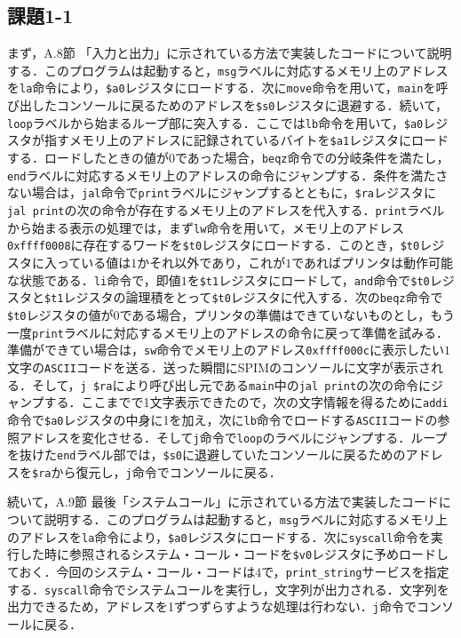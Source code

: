 \subsection{課題1-1}
まず，A.8節 「入力と出力」に示されている方法で実装したコードについて説明する\cite{book:assembly}．このプログラムは起動すると，\verb|msg|ラベルに対応するメモリ上のアドレスを\verb|la|命令により，\verb|$a0|レジスタにロードする．次に\verb|move|命令を用いて，\verb|main|を呼び出したコンソールに戻るためのアドレスを\verb|$s0|レジスタに退避する．続いて，\verb|loop|ラベルから始まるループ部に突入する．ここでは\verb|lb|命令を用いて，\verb|$a0|レジスタが指すメモリ上のアドレスに記録されているバイトを\verb|$a1|レジスタにロードする．ロードしたときの値が$0$であった場合，\verb|beqz|命令での分岐条件を満たし，\verb|end|ラベルに対応するメモリ上のアドレスの命令にジャンプする．条件を満たさない場合は，\verb|jal|命令で\verb|print|ラベルにジャンプするとともに，\verb|$ra|レジスタに\verb|jal print|の次の命令が存在するメモリ上のアドレスを代入する．\verb|print|ラベルから始まる表示の処理では，まず\verb|lw|命令を用いて，メモリ上のアドレス\verb|0xffff0008|に存在するワードを\verb|$t0|レジスタにロードする．このとき，\verb|$t0|レジスタに入っている値は$1$かそれ以外であり，これが$1$であればプリンタは動作可能な状態である．\verb|li|命令で，即値$1$を\verb|$t1|レジスタにロードして，\verb|and|命令で\verb|$t0|レジスタと\verb|$t1|レジスタの論理積をとって\verb|$t0|レジスタに代入する．次の\verb|beqz|命令で\verb|$t0|レジスタの値が$0$である場合，プリンタの準備はできていないものとし，もう一度\verb|print|ラベルに対応するメモリ上のアドレスの命令に戻って準備を試みる．準備ができてい場合は，\verb|sw|命令でメモリ上のアドレス\verb|0xffff000c|に表示したい$1$文字の\verb|ASCII|コードを送る．送った瞬間にSPIMのコンソールに文字が表示される．そして，\verb|j $ra|により呼び出し元である\verb|main|中の\verb|jal print|の次の命令にジャンプする．ここまでで1文字表示できたので，次の文字情報を得るために\verb|addi|命令で\verb|$a0|レジスタの中身に1を加え，次に\verb|lb|命令でロードする\verb|ASCII|コードの参照アドレスを変化させる．そして\verb|j|命令で\verb|loop|のラベルにジャンプする．ループを抜けた\verb|end|ラベル部では，\verb|$s0|に退避していたコンソールに戻るためのアドレスを\verb|$ra|から復元し，\verb|j|命令でコンソールに戻る．

続いて，A.9節 最後「システムコール」に示されている方法で実装したコードについて説明する\cite{book:assembly}．このプログラムは起動すると，\verb|msg|ラベルに対応するメモリ上のアドレスを\verb|la|命令により，\verb|$a0|レジスタにロードする．次に\verb|syscall|命令を実行した時に参照されるシステム・コール・コードを\verb|$v0|レジスタに予めロードしておく．今回のシステム・コール・コードは$4$で，\verb|print_string|サービスを指定する．\verb|syscall|命令でシステムコールを実行し，文字列が出力される．文字列を出力できるため，アドレスを1ずつずらすような処理は行わない．\verb|j|命令でコンソールに戻る．


